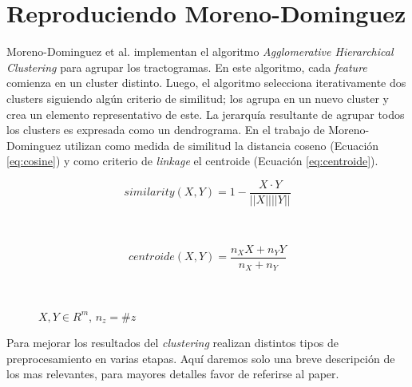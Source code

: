 \section{Reproduciendo Moreno-Dominguez}

Moreno-Dominguez et al. \cite{Moreno-Dominguez2014} implementan el algoritmo
\textit{Agglomerative Hierarchical Clustering} para agrupar los tractogramas. 
En este algoritmo, cada \textit{feature} comienza en un cluster distinto. Luego,
el algoritmo selecciona iterativamente dos clusters siguiendo alg\'un criterio
de similitud; los agrupa en un nuevo cluster y crea un elemento representativo
de este. La jerarqu\'ia resultante de agrupar todos los clusters es expresada
como un dendrograma. En el trabajo de Moreno-Dominguez utilizan como medida de
similitud la distancia coseno (Ecuaci\'on \ref{eq:cosine}) y como criterio de
\textit{linkage} el centroide (Ecuaci\'on \ref{eq:centroide}).

\begin{figure}[h!]
                                                                                                                        
\begin{minipage}[b]{0.49\textwidth}
    \begin{equation}
        \label{eq:cosine}
        similarity(X,Y) = 1 - \frac{ X \cdot Y }{||X|| ||Y||}
    \end{equation}
\end{minipage} ~
\hfill
\begin{minipage}[b]{0.49\textwidth}
    \begin{equation}
        \label{eq:centroide}
        centroide(X,Y) = \frac{ n_X X + n_Y Y}{n_X + n_Y}
    \end{equation}
\end{minipage} ~

\centering
\vspace{0.5cm}
\small{$X, Y \in R^m$, $n_z = \#z$}

\end{figure}  

Para mejorar los resultados del \textit{clustering} realizan distintos tipos de
preprocesamiento en varias etapas. Aqu\'i daremos solo una breve descripci\'on 
de los mas relevantes, para mayores detalles favor de referirse al paper. \\

